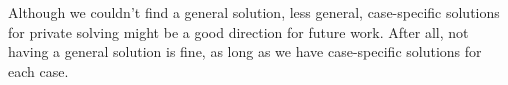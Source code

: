 \documentclass[
    9pt,            %
    report,        %
    affiltop,       %
]{art}
\begin{document}
Although we couldn't find a general solution, less general, case-specific solutions for private solving might be a good direction for future work. After all, not having a general solution is fine, as long as we have case-specific solutions for each case.


\nocite{*}

\end{document}
